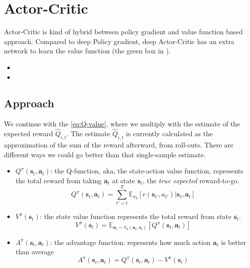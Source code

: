\chapter{Actor-Critic}
Actor-Critic is kind of hybrid between policy gradient and value function based approach. Compared to deep Policy gradient, deep Actor-Critic has an extra network to learn the value function (the green box in ).
\begin{itemize}
	\item {}
	\item {}
\end{itemize}

\section{Approach}
We continue with the \eqref{eq:Q-value}, where we multiply with the estimate of the expected reward $\widehat{Q}_{i,t}$. The estimate $\widehat{Q}_{i,t}$ is currently calculated as the approximation of the sum of the reward afterward, from roll-outs. There are different ways we could go better than that single-sample estimate.

\begin{itemize}
	\item $Q^\pi(\textbf{s}_t, \textbf{a}_t)$: the Q-function, \ac{aka}, the state-action value function, represents the total reward from taking $\textbf{a}_t$ at state $\textbf{s}_t$, the \textit{true expected} reward-to-go.
	\begin{equation}
		Q^\pi(\textbf{s}_t, \textbf{a}_t) = \sum_{t'=t}^T \mathbb{E}_{\pi_{\theta}}[r(\textbf{s}_{t'}, a_{t'})|\textbf{s}_t, \textbf{a}_t]
		\label{eq:q-function}
	\end{equation}
	\item $V^\pi(\textbf{s}_t)$: the state value function represents the total reward from state $\textbf{s}_t$.
	\begin{equation}
		V^\pi(\textbf{s}_t) = \mathbb{E}_{\textbf{a}_t \sim \pi_{\theta}(\textbf{a}_t, \textbf{s}_t)} [Q^\pi(\textbf{s}_t, \textbf{a}_t)]
	\end{equation}
	\item $A^\pi(\textbf{s}_t, \textbf{a}_t)$: the advantage function: represents how much action $\textbf{a}_t$ is better than average
	\begin{equation}
		A^\pi(\textbf{s}_t, \textbf{a}_t) = Q^\pi(\textbf{s}_t, \textbf{a}_t) - V^\pi(\textbf{s}_t)
		\label{eq:a-function}
	\end{equation}
\end{itemize}

